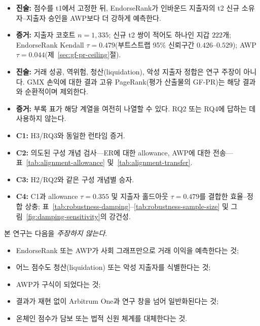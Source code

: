 
\begin{itemize}
\item \textbf{진술:} 점수를 t1에서 고정한 뒤, EndorseRank가 인바운드 지출자의 t2 신규 소유자--지출자 승인을 AWP보다 더 강하게 예측한다.

\item \textbf{증거:} 지출자 코호트 $n=1{,}335$; 신규 t2 쌍이 적어도 하나인 지갑 $222$개; EndorseRank Kendall $\tau=0.479$(부트스트랩 95\% 신뢰구간 $0.426$--$0.529$); AWP $\tau=0.044$(제~\ref{sec:gf-pr-ceiling}절).
\end{itemize}


\begin{itemize}
\item \textbf{진술:} 거래 성공, 역위험, 청산(liquidation), 악성 지출자 정합은 연구 주장이 아니다. GMX 손익에 대한 결과 고유 PageRank(평가 산출물의 GF-PR)는 해당 결과와 순환적이며 제외한다.

\item \textbf{증거:} 부록 표가 해당 계열을 여전히 나열할 수 있다. RQ2 또는 RQ4에 답하는 데 사용하지 않는다.
\end{itemize}


\begin{itemize}
\item \textbf{C1:} H3/RQ3와 동일한 런타임 증거.
\item \textbf{C2:} 의도된 구성 개념 검사---ER에 대한 allowance, AWP에 대한 전송---표~\ref{tab:alignment-allowance} 및~\ref{tab:alignment-transfer}.
\item \textbf{C3:} H2/RQ2와 같은 구성 개념별 승자.
\item \textbf{C4:} C1과 allowance $\tau=0.355$ 및 지출자 홀드아웃 $\tau=0.479$를 결합한 효율--정합 상충; 표~\ref{tab:robustness-damping}--\ref{tab:robustness-sample-size} 및 그림~\ref{fig:damping-sensitivity}의 강건성.
\end{itemize}


본 연구는 다음을 \emph{주장하지 않는다}.

\begin{itemize}
\item EndorseRank 또는 AWP가 사회 그래프만으로 거래 이익을 예측한다는 것;
\item 어느 점수도 청산(liquidation) 또는 악성 지출자를 식별한다는 것;
\item AWP가 구식이 되었다는 것;
\item 결과가 재현 없이 Arbitrum One과 연구 창을 넘어 일반화된다는 것;
\item 온체인 점수가 담보 또는 법적 신원 체계를 대체한다는 것.
\end{itemize}

